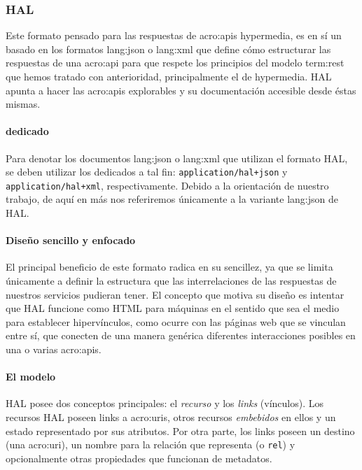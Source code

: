 \subsubsection{HAL}
\label{soa:tecnologias:hal}

Este formato pensado para las respuestas de \glspl{acro:api} hypermedia, es en sí un  basado en los formatos \gls{lang:json} o \gls{lang:xml} que define cómo estructurar las respuestas de una \gls{acro:api} para que respete los principios del modelo \gls{term:rest} que hemos tratado con anterioridad, principalmente el de hypermedia. HAL apunta a hacer las \glspl{acro:api} explorables y su documentación accesible desde éstas mismas.

\paragraph{ dedicado}

Para denotar los documentos \gls{lang:json} o \gls{lang:xml} que utilizan el formato HAL, se deben utilizar los  dedicados a tal fin: \texttt{application/hal+json} y \texttt{application/hal+xml}, respectivamente. Debido a la orientación de nuestro trabajo, de aquí en más nos referiremos únicamente a la variante \gls{lang:json} de HAL.

\paragraph{Diseño sencillo y enfocado}

El principal beneficio de este formato radica en su sencillez, ya que se limita únicamente a definir la estructura que las interrelaciones de las respuestas de nuestros servicios pudieran tener. El concepto que motiva su diseño es intentar que HAL funcione como HTML para máquinas en el sentido que sea el medio para establecer hipervínculos, como ocurre con las páginas web que se vinculan entre sí, que conecten de una manera genérica diferentes interacciones posibles en una o varias \glspl{acro:api}.

\paragraph{El modelo}

HAL posee dos conceptos principales: el \textit{recurso} y los \textit{links} (vínculos). Los recursos HAL poseen links a \glspl{acro:uri}, otros recursos \textit{embebidos} en ellos y un estado representado por sus atributos. Por otra parte, los links poseen un destino (una \gls{acro:uri}), un nombre para la relación que representa (o \texttt{rel}) y opcionalmente otras propiedades que funcionan de metadatos.

